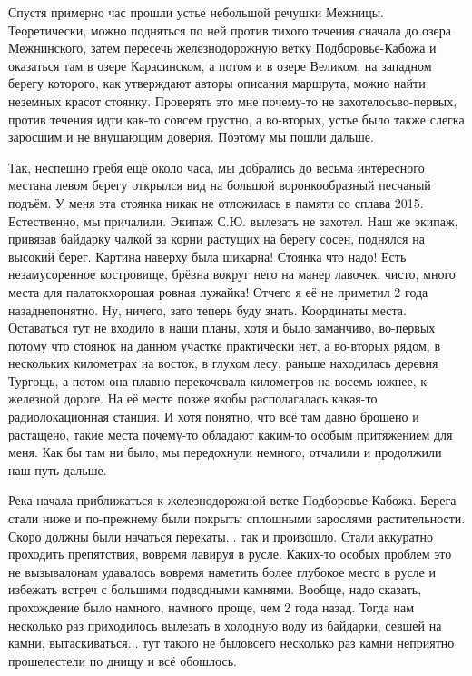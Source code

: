 Спустя примерно час прошли устье небольшой речушки Межницы. Теоретически, можно подняться по ней против тихого течения сначала до озера Межнинского, затем пересечь железнодорожную ветку Подборовье-Кабожа и оказаться там в озере Карасинском, а потом и в озере Великом, на западном берегу которого, как утверждают авторы описания маршрута, можно найти неземных красот стоянку. Проверять это мне почему-то не захотелось\mdash во-первых, против течения идти как-то совсем грустно, а во-вторых, устье было также слегка заросшим и не внушающим доверия. Поэтому мы пошли дальше.

Так, неспешно гребя ещё около часа, мы добрались до весьма интересного места\mdash на левом берегу открылся вид на большой воронкообразный песчаный подъём. У меня эта стоянка никак не отложилась в памяти со сплава 2015. Естественно, мы причалили. Экипаж С.Ю. вылезать не захотел. Наш же экипаж, привязав байдарку чалкой за корни растущих на берегу сосен, поднялся на высокий берег. Картина наверху была шикарна! Стоянка что надо! Есть незамусоренное костровище, брёвна вокруг него на манер лавочек, чисто, много места для палаток\mdash хорошая ровная лужайка! Отчего я её не приметил 2 года назад\mdash непонятно. Ну, ничего, зато теперь буду знать. Координаты места\mdash \CoordsLidSuperPlace. Оставаться тут не входило в наши планы, хотя и было заманчиво, во-первых потому что стоянок на данном участке практически нет, а во-вторых рядом, в нескольких километрах на восток, в глухом лесу, раньше находилась деревня Тургощь, а потом она плавно перекочевала километров на восемь южнее, к железной дороге. На её месте позже якобы располагалась какая-то радиолокационная станция. И хотя понятно, что всё там давно брошено и растащено, такие места почему-то обладают каким-то особым притяжением для меня. Как бы там ни было, мы передохнули немного, отчалили и продолжили наш путь дальше.

Река начала приближаться к железнодорожной ветке Подборовье-Кабожа. Берега стали ниже и по-прежнему были покрыты сплошными зарослями растительности. Скоро должны были начаться перекаты$\ldots$ так и произошло. Стали аккуратно проходить препятствия, вовремя лавируя в русле. Каких-то особых проблем это не вызывало\mdash нам удавалось вовремя наметить более глубокое место в русле и избежать встреч с большими подводными камнями. Вообще, надо сказать, прохождение было намного, намного проще, чем 2 года назад. Тогда нам несколько раз приходилось вылезать в холодную воду из байдарки, севшей на камни, вытаскиваться$\ldots$ тут такого не было\mdash всего несколько раз камни неприятно прошелестели по днищу и всё обошлось. 

